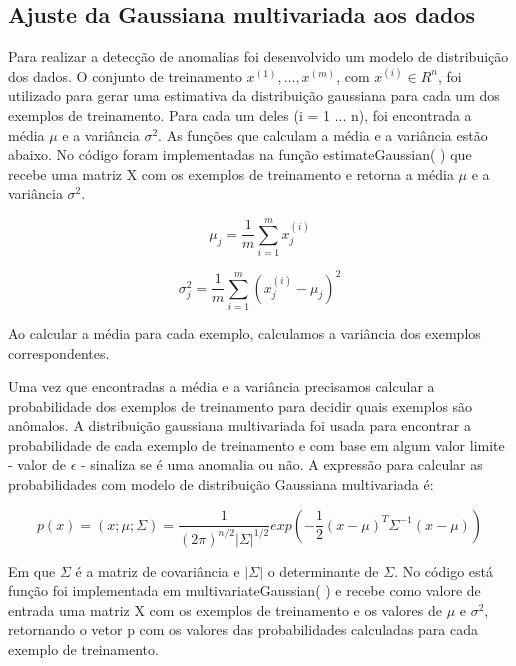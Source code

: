 \documentclass[12pt]{article}
\begin{document}
\subsection{Ajuste da Gaussiana multivariada aos dados} \label{gau_mult}
Para realizar a detecção de anomalias foi desenvolvido um modelo de distribuição dos dados. O conjunto de treinamento $x^{(1)},…, x^{(m)}$, com $x^{(i)} \in R ^ n$, foi utilizado para gerar uma estimativa da distribuição gaussiana para cada um dos exemplos de treinamento. Para cada um deles (i = 1 ... n), foi encontrada  a média $\mu$ e a variância $\sigma^{2}$. As funções que calculam a média e a variância estão abaixo. No código foram implementadas na função estimateGaussian( ) que recebe uma matriz X com os exemplos de treinamento e retorna a média $\mu$ e a variância $\sigma^{2}$.

\begin{equation} \label{eq_mu}
\mu_{j} = \frac{1}{m}\sum^{m}_{i=1}x^{(i)}_{j} 
\end{equation}

\begin{equation} \label{eq_sig}
\sigma^{2}_{j} = \frac{1}{m}\sum^{m}_{i=1}(x^{(i)}_{j} - \mu_{j})^{2} 
\end{equation}

Ao calcular a média para cada exemplo, calculamos a variância dos exemplos correspondentes. 

Uma vez que encontradas a média e a variância precisamos calcular a probabilidade dos exemplos de treinamento para decidir quais exemplos são anômalos. 
A distribuição gaussiana multivariada foi usada para encontrar a probabilidade de cada exemplo de treinamento e com base em algum valor limite - valor de $\epsilon$ - sinaliza se é uma anomalia ou não. A expressão para calcular as probabilidades com modelo de distribuição Gaussiana multivariada é:

\begin{equation} \label{eq_p}
p(x) = (x;\mu;\Sigma) = \frac{1}{(2\pi)^{n/2}|\Sigma|^{1/2}}exp(-\frac{1}{2}(x-\mu)^{T}\Sigma^{-1}(x - \mu)) 
\end{equation}

Em que $\Sigma$ é a matriz de covariância e $|\Sigma|$ o determinante de $\Sigma$. No código está função foi implementada em multivariateGaussian( ) e recebe como valore de entrada uma matriz X com os exemplos de treinamento e os valores de $\mu$ e $\sigma^2$, retornando o vetor p com os valores das probabilidades calculadas para cada exemplo de treinamento.
\end{document}
